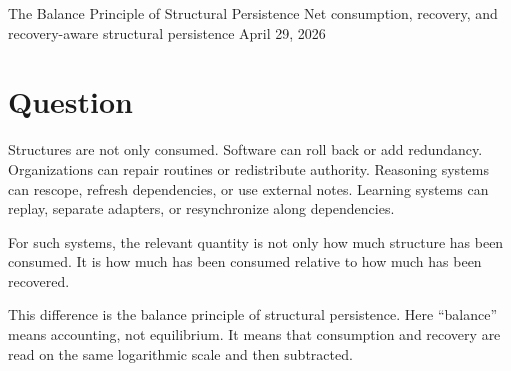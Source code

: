 \documentclass[12pt,a4paper]{article}
\begin{document}
\PaperTitleBlock
  {The Balance Principle of Structural Persistence}
  {Net consumption, recovery, and recovery-aware structural persistence}
  {April 29, 2026}

\begin{abstract}
The minimal form of structural persistence gives the closed shrinkage kernel

\[
S=Me^{-L},
\]

where \(L\) is cumulative structural consumption measured as logarithmic shrinkage of a feasible region.

This paper extends that kernel to systems with repair, recovery, redundancy, rollback, reconfiguration, and external support. At each time step, let \(d_{t}\) be structural consumption and \(r_{t}\) be recovery. Define net structural consumption by

\[
b_{t}=d_{t}-r_{t}.
\]

For a finite horizon \(n\),

\[
B_{n}=\sum_{t<n}b_{t}.
\]

Then the feasible-region mass satisfies

\[
m(V^{(n)})=m(V^{(0)})e^{-B_{n}}.
\]

With the resource-side term,

\[
S_{n}=M_{n} e^{-B_{n}}.
\]

This does not replace the minimal kernel. If \(r_{t}=0\), then \(B_{n}=L_{n}\). The central claim is that, in recovery-aware systems, structural persistence is governed by net consumption rather than consumption alone.
\end{abstract}

\section{Question}\label{question}

Structures are not only consumed. Software can roll back or add redundancy. Organizations can repair routines or redistribute authority. Reasoning systems can rescope, refresh dependencies, or use external notes. Learning systems can replay, separate adapters, or resynchronize along dependencies.

For such systems, the relevant quantity is not only how much structure has been consumed. It is how much has been consumed relative to how much has been recovered.

This difference is the balance principle of structural persistence. Here ``balance'' means accounting, not equilibrium. It means that consumption and recovery are read on the same logarithmic scale and then subtracted.
\end{document}
